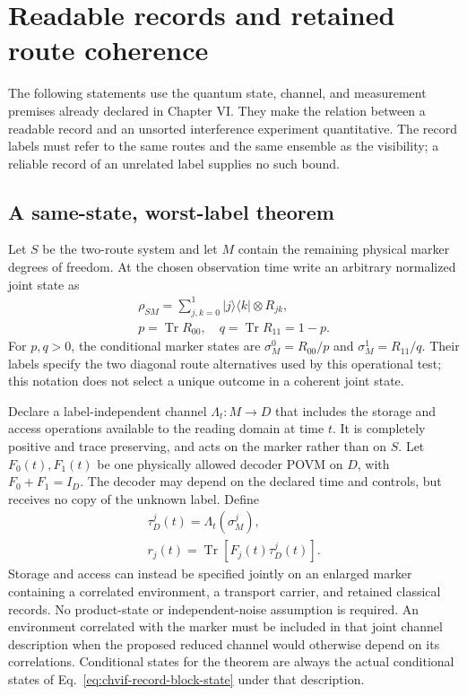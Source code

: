 \section{Readable records and retained route coherence}
\label{sec:chvif-readable-records}

The following statements use the quantum state, channel, and measurement
premises already declared in Chapter VI. They make the relation between a
readable record and an unsorted interference experiment quantitative. The
record labels must refer to the same routes and the same ensemble as the
visibility; a reliable record of an unrelated label supplies no such bound.

\subsection{A same-state, worst-label theorem}
\label{sec:chvif-record-visibility-theorem}

Let $S$ be the two-route system and let $M$ contain the remaining physical
marker degrees of freedom. At the chosen observation time write an arbitrary
normalized joint state as
\begin{equation}
\begin{gathered}
\rho_{SM}=\sum_{j,k=0}^{1}|j\rangle\langle k|\otimes R_{jk},
 \\
 p=\operatorname{Tr}R_{00},\quad q=\operatorname{Tr}R_{11}=1-p.
\end{gathered}
\label{eq:chvif-record-block-state}
\end{equation}
For $p,q>0$, the conditional marker states are
$\sigma_M^0=R_{00}/p$ and $\sigma_M^1=R_{11}/q$. Their labels specify
the two diagonal route alternatives used by this operational test; this
notation does not select a unique outcome in a coherent joint state.

Declare a label-independent channel $\Lambda_t:M\longrightarrow D$ that
includes the storage and access operations available to the reading domain
at time $t$. It is completely positive and trace preserving, and acts on
the marker rather than on $S$. Let $F_0(t),F_1(t)$ be one physically
allowed decoder POVM on $D$, with $F_0+F_1=I_D$. The decoder may depend
on the declared time and controls, but receives no copy of the unknown
label. Define
\begin{equation}
\begin{gathered}
\tau_D^j(t)=\Lambda_t(\sigma_M^j),\\
 r_j(t)=\operatorname{Tr}[F_j(t)\tau_D^j(t)].
\end{gathered}
\label{eq:chvif-decoder-conditional-success}
\end{equation}
Storage and access can instead be specified jointly on an enlarged marker
containing a correlated environment, a transport carrier, and retained
classical records. No product-state or independent-noise assumption is
required. An environment correlated with the marker must be included in
that joint channel description when the proposed reduced channel would
otherwise depend on its correlations. Conditional states for the theorem
are always the actual conditional states of
Eq.~\eqref{eq:chvif-record-block-state} under that description.

